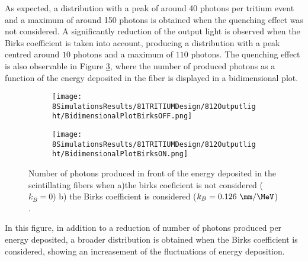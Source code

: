 As expected, a distribution with a peak of around 40 photons per tritium event and a maximum of around 150 photons is obtained when the quenching effect was not considered. A significantly reduction of the output light is observed when the Birks coefficient is taken into account, producing a distribution with a peak centred around $10$ photons and a maximum of $110$ photons. The quenching effect is also observable in Figure \ref{fig:2DimPlotBirks}, where the number of produced photons as a function of the energy deposited in the fiber is displayed in a bidimensional plot.

\begin{figure}
\centering
    \begin{subfigure}[b]{0.4\textwidth}
    \centering
    \texttt{[image: 8SimulationsResults/81TRITIUMDesign/812Outputlight/BidimensionalPlotBirksOFF.png]}  
    \caption{\label{subfig:2DimPlotNoBirks}}
    \end{subfigure}
    \hfill
    \begin{subfigure}[b]{0.4\textwidth}
    \centering
    \texttt{[image: 8SimulationsResults/81TRITIUMDesign/812Outputlight/BidimensionalPlotBirksON.png]}  
    \caption{\label{subfig:2DimPlotBirks}}
    \end{subfigure}
 \caption{Number of photons produced in front of the energy deposited in the scintillating fibers when a)the birks coeficient is not considered ($k_B=0$) b) the Birks coefficient is considered ($k_B=0.126~\mm/\MeV$) \cite{SimulationPaperCarlos}.}
 \label{fig:2DimPlotBirks}
\end{figure}

In this figure, in addition to a reduction of number of photons produced per energy deposited, a broader distribution is obtained when the Birks coefficient is considered, showing an increasement of the fluctuations of energy deposition.